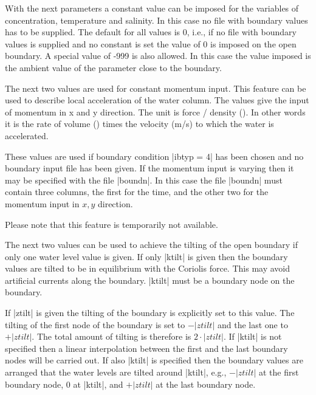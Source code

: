 With the next parameters a constant value can be imposed for the
variables of concentration, temperature and salinity. In this case
no file with boundary values has to be supplied. The default for all
values is 0, i.e., if no file with boundary values is supplied and
no constant is set the value of 0 is imposed on the open boundary.
A special value of -999 is also allowed. In this case the value
imposed is the ambient value of the parameter close to the boundary.

\par

The next two values are used for constant momentum input.
This feature can be used to describe local acceleration of the
water column. The values give the input of momentum
in x and y direction. The unit is force / density (\maccelunit).
In other words it is the rate of volume (\dischargeunit) times
the velocity (m/s) to which the water is accelerated.

These values are used if
boundary condition |ibtyp = 4| has been chosen and
no boundary input file has been given.
If the momentum input is varying then it may be specified with
the file |boundn|. In this case the file |boundn| must contain
three columns, the first for the time, and the other two for
the momentum input in $x,y$ direction.

Please note that this feature is temporarily not available.

\par

The next two values can be used
to achieve the tilting of the open boundary if only one water level value
is given. If only |ktilt| is given then the boundary values
are tilted to be in equilibrium with the Coriolis force. This may avoid
artificial currents along the boundary. |ktilt| must be a boundary node
on the boundary.

If |ztilt| is given the tilting of the boundary is explicitly set
to this value. The tilting of the first node of the boundary is set
to $-|ztilt|$
and the last one to $+|ztilt|$. The total amount of tilting is
therefore is $2 \cdot |ztilt|$. If |ktilt| is not specified
then a linear interpolation between the first and the last boundary
nodes will be carried out. If also |ktilt| is specified then
the boundary values are arranged that the water levels are
tilted around |ktilt|, e.g., $-|ztilt|$ at the first boundary node,
0 at |ktilt|, and $+|ztilt|$ at the last boundary node.

